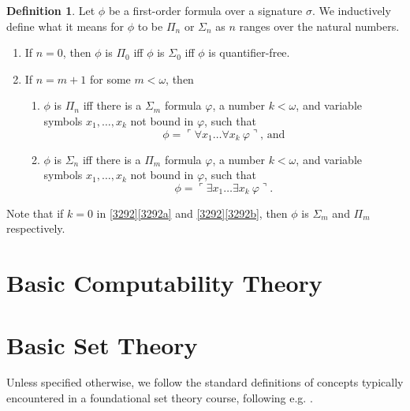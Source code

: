 \documentclass[12pt, twoside]{memoir}
\numberwithin{equation}{section}
\theoremstyle{definition}
\newtheorem{defi}[thm]{Definition}
\theoremstyle{remark}
\theoremstyle{definition}
\theoremstyle{definition}
\theoremstyle{definition}
\theoremstyle{remark}
\begin{document}
\begin{defi}\label{def25}
Let $\phi$ be a first-order formula over a signature $\sigma$. We inductively define what it means for $\phi$ to be $\Pi_n$ or $\Sigma_n$ as $n$ ranges over the natural numbers.
\begin{enumerate}[label=(\arabic*)]
    \item If $n = 0$, then $\phi$ is $\Pi_0$ iff $\phi$ is $\Sigma_0$ iff $\phi$ is quantifier-free.
    \item\label{3292} If $n = m + 1$ for some $m < \omega$, then 
    \begin{enumerate}[label=(\alph*)]
        \item\label{3292a} $\phi$ is $\Pi_n$ iff there is a $\Sigma_m$ formula $\varphi$, a number $k < \omega$, and variable symbols $x_1, \dots, x_k$ not bound in $\varphi$, such that 
        \begin{equation*}
            \phi = \ulcorner \forall x_1 \dots \forall x_k \ \varphi \urcorner \text{, and}
        \end{equation*}
        \item\label{3292b} $\phi$ is $\Sigma_n$ iff there is a $\Pi_m$ formula $\varphi$, a number $k < \omega$, and variable symbols $x_1, \dots, x_k$ not bound in $\varphi$, such that 
        \begin{equation*}
            \phi = \ulcorner \exists x_1 \dots \exists x_k \ \varphi \urcorner \text{.}
        \end{equation*}
    \end{enumerate}
\end{enumerate}
Note that if $k = 0$ in \ref{3292}\ref{3292a} and \ref{3292}\ref{3292b}, then $\phi$ is $\Sigma_m$ and $\Pi_m$ respectively.
\end{defi}

\section{Basic Computability Theory}

\section{Basic Set Theory}

Unless specified otherwise, we follow the standard definitions of concepts typically encountered in a foundational set theory course, following e.g. \cite{jechhrbacek}.
\end{document}
